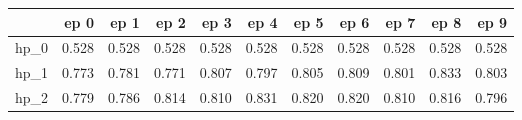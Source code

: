 \begin{tabular}{lrrrrrrrrrr}
\toprule
{} &   ep 0 &   ep 1 &   ep 2 &   ep 3 &   ep 4 &   ep 5 &   ep 6 &   ep 7 &   ep 8 &   ep 9 \\
\midrule
hp\_0 &  0.528 &  0.528 &  0.528 &  0.528 &  0.528 &  0.528 &  0.528 &  0.528 &  0.528 &  0.528 \\
hp\_1 &  0.773 &  0.781 &  0.771 &  0.807 &  0.797 &  0.805 &  0.809 &  0.801 &  0.833 &  0.803 \\
hp\_2 &  0.779 &  0.786 &  0.814 &  0.810 &  0.831 &  0.820 &  0.820 &  0.810 &  0.816 &  0.796 \\
\bottomrule
\end{tabular}

